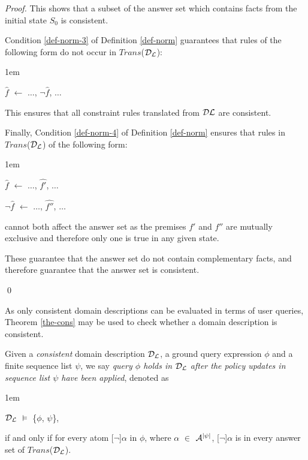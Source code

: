 \documentclass[global,twocolumn,final]{svjour}
\newenvironment{vdefinition}
  {\begin{definition}\hspace{0.25em}}
  {\end{definition}}
\newenvironment{vproof}
  {\begin{proof}\hspace{0.25em}}
  {\qed\end{proof}}
\newenvironment{vquote}
  {\begin{list}{}{\leftmargin 1em}\item[]}
  {\end{list}}
\begin{document}
\begin{vproof}
      This shows that a subset of the answer set which contains facts from the
      initial state $S_{0}$ is consistent.

      Condition \ref{def-norm-3} of Definition \ref{def-norm} guarantees that
      rules of the following form do not occur in $Trans$(${\cal D}_{\cal L}$):

      \begin{vquote}
        $\hat{f}$ $\leftarrow$ $\hdots$, $\lnot\hat{f}$, $\hdots$
      \end{vquote}

      This ensures that all constraint rules translated from
      ${\cal D}{\cal L}$ are consistent.

      Finally, Condition \ref{def-norm-4} of Definition \ref{def-norm}
      ensures that rules in $Trans$(${\cal D}_{\cal L}$) of the following form:

      \begin{vquote}
        $\hat{f}$ $\leftarrow$ $\hdots$, $\hat{f'}$, $\hdots$

        $\lnot \hat{f}$ $\leftarrow$ $\hdots$, $\hat{f''}$, $\hdots$
      \end{vquote}

      \noindent
      cannot both affect the answer set as the premises $f'$ and $f''$ are
      mutually exclusive and therefore only one is true in any given state.

      These guarantee that the answer set do not contain complementary facts,
      and therefore guarantee that the answer set is consistent.

    \end{vproof}

    As only consistent domain descriptions can be evaluated in terms of user
    queries, Theorem \ref{the-cons} may be used to check whether a domain
    description is consistent.

    \begin{vdefinition}
      \label{def-eval}
      Given a {\em consistent} domain description ${\cal D}_{\cal L}$, a ground
      query expression $\phi$ and a finite sequence list $\psi$, we say
      {\em query $\phi$ holds in ${\cal D}_{\cal L}$ after the policy updates
      in sequence list $\psi$ have been applied}, denoted as

      \begin{vquote}
        ${\cal D}_{\cal L}$ $\models$ \{$\phi$, $\psi$\},
      \end{vquote}

      \noindent if and only if for every atom [$\lnot$]$\alpha$ in $\phi$,
      where $\alpha$ $\in$ ${\cal A}^{|\psi|}$, [$\lnot$]$\alpha$ is in
      every answer set of $Trans$(${\cal D}_{\cal L}$).
    \end{vdefinition}
\end{document}
